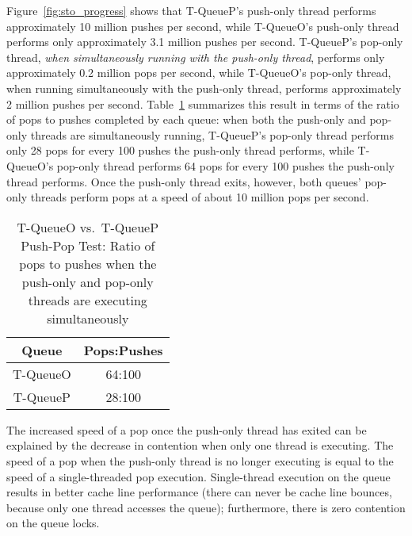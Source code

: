 Figure~\ref{fig:sto_progress} shows that T-QueueP's push-only thread performs approximately 10 million pushes per second, while T-QueueO's push-only thread performs only approximately 3.1 million pushes per second. T-QueueP's pop-only thread, \emph{when simultaneously running with the push-only thread}, performs only approximately 0.2 million pops per second, while T-QueueO's pop-only thread, when running simultaneously with the push-only thread, performs approximately 2 million pushes per second.
Table~\ref{tab:sto_pop_push_ratio} summarizes this result in terms of the ratio of pops to pushes completed by each queue: when both the push-only and pop-only threads are simultaneously running, T-QueueP's pop-only thread performs only 28 pops for every 100 pushes the push-only thread performs, while T-QueueO's pop-only thread performs 64 pops for every 100 pushes the push-only thread performs.
Once the push-only thread exits, however, both queues' pop-only threads perform pops at a speed of about 10 million pops per second. 

\begin{table}[t]
        \centering
    \begin{tabular}{|cc|}
        \hline
        Queue & Pops:Pushes\\
        \hline
            T-QueueO & 64:100\\
            T-QueueP & 28:100\\
        \hline
    \end{tabular}
    \caption{T-QueueO vs.\ T-QueueP Push-Pop Test: Ratio of pops to pushes when the push-only and pop-only threads are executing simultaneously}
    \label{tab:sto_pop_push_ratio}
\end{table}

The increased speed of a pop once the push-only thread has exited can be explained by the decrease in contention when only one thread is executing. The speed of a pop when the push-only thread is no longer executing is equal to the speed of a single-threaded pop execution. Single-thread execution on the queue results in better cache line performance (there can never be cache line bounces, because only one thread accesses the queue); furthermore, there is zero contention on the queue locks. 

